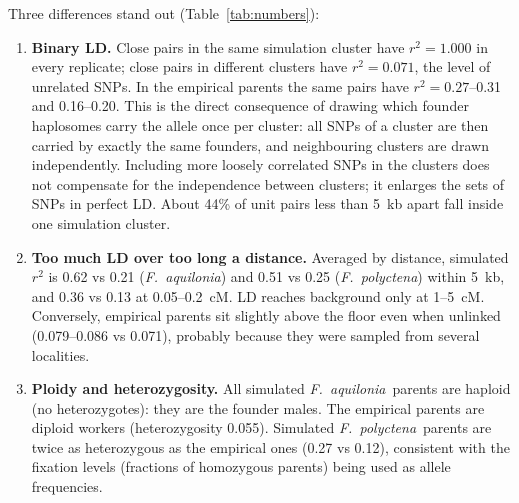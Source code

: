 \documentclass[11pt,a4paper]{article}
\newcommand{\Fa}{\textit{F.~aquilonia}}
\newcommand{\Fp}{\textit{F.~polyctena}}
\begin{document}
Three differences stand out (Table~\ref{tab:numbers}):
\begin{enumerate}
  \item \textbf{Binary LD.} Close pairs in the same simulation cluster have $r^2=1.000$ in every replicate; close pairs in different clusters have $r^2=0.071$, the level of unrelated SNPs. In the empirical parents the same pairs have $r^2=0.27$--0.31 and 0.16--0.20. This is the direct consequence of drawing which founder haplosomes carry the allele once per cluster: all SNPs of a cluster are then carried by exactly the same founders, and neighbouring clusters are drawn independently. Including more loosely correlated SNPs in the clusters does not compensate for the independence between clusters; it enlarges the sets of SNPs in perfect LD. About 44\% of unit pairs less than 5~kb apart fall inside one simulation cluster.
  \item \textbf{Too much LD over too long a distance.} Averaged by distance, simulated $r^2$ is 0.62 vs 0.21 (\Fa) and 0.51 vs 0.25 (\Fp) within 5~kb, and 0.36 vs 0.13 at 0.05--0.2~cM. LD reaches background only at 1--5~cM. Conversely, empirical parents sit slightly above the floor even when unlinked (0.079--0.086 vs 0.071), probably because they were sampled from several localities.
  \item \textbf{Ploidy and heterozygosity.} All simulated \Fa\ parents are haploid (no heterozygotes): they are the founder males. The empirical parents are diploid workers (heterozygosity 0.055). Simulated \Fp\ parents are twice as heterozygous as the empirical ones (0.27 vs 0.12), consistent with the fixation levels (fractions of homozygous parents) being used as allele frequencies.
\end{enumerate}
\end{document}
